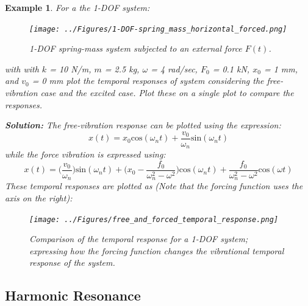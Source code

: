 \documentclass[12pt,letter]{article}
\newtheorem{ex}{Example}
\numberwithin{ex}{section} %
\newenvironment{example}{\begin{mdframed}[middlelinewidth=0.5mm]\begin{ex}\normalfont}{\end{ex}\end{mdframed}}
\numberwithin{re}{section} %
\begin{document}
			\begin{example}
				For a the 1-DOF system:
				\begin{figure}[H]
					\centering
					\texttt{[image: ../Figures/1-DOF-spring\_mass\_horizontal\_forced.png]}
					\caption{1-DOF spring-mass system subjected to an external force $F(t)$.}
				\end{figure}
				with with $k$ = 10 N/m, $m$ = 2.5 kg, $\omega$ = 4 rad/sec, $F_0$ = 0.1 kN, $x_0$ = 1 mm, and $v_0$ = 0 mm plot the temporal responses of system considering the free-vibration case and the excited case. Plot these on a single plot to compare the responses. 
							
				\noindent\textbf{Solution:} The free-vibration response can be plotted using the expression:
				\begin{equation}
					x(t) = x_0\text{cos}(\omega_n t) + \frac{v_0}{\omega_n}\text{sin}(\omega_n t)
				\end{equation}				
				while the force vibration is expressed using:
				\begin{equation}
					x(t) = \Big(\frac{v_0}{\omega_n}\Big)\text{sin}(\omega_n t) + \Big(x_0-\frac{f_0}{\omega_n^2-\omega^2}\Big)\text{cos}(\omega_n t) + \frac{f_0}{\omega_n^2-\omega^2}\text{cos}(\omega t)
				\end{equation}	
				These temporal responses are plotted as (Note that the forcing function uses the axis on the right):
				\begin{figure}[H]
					\centering
					\texttt{[image: ../Figures/free\_and\_forced\_temporal\_response.png]}
					\caption{Comparison of the temporal response for a 1-DOF system; expressing how the forcing function changes the vibrational  temporal response of the system.}
				\end{figure}	
			\end{example}
			
			
		\subsection{Harmonic Resonance}			
			
\end{document}
